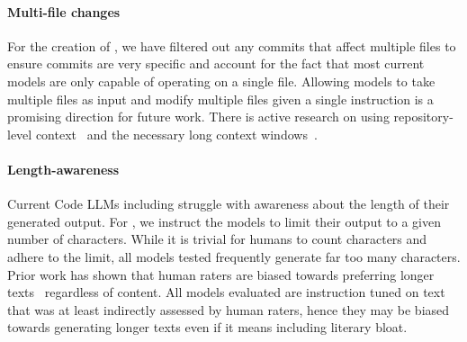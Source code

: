 \paragraph{Multi-file changes} For the creation of \data{}, we have filtered out any commits that affect multiple files to ensure commits are very specific and account for the fact that most current models are only capable of operating on a single file. Allowing models to take multiple files as input and modify multiple files given a single instruction is a promising direction for future work. There is active research on using repository-level context~\citep{ding2022cocomic,shrivastava2023repofusion,shrivastava2023repository,zhang2023repocoder,liu2023repobench} and the necessary long context windows~\citep{dai2019transformer,press2021train,Sun2021DoLL,dao2022flashattention,peng2023rwkv,liu2023lost,chen2023extending}.

\paragraph{Length-awareness} Current Code LLMs including \model{} struggle with awareness about the length of their generated output. For \evale{}, we instruct the models to limit their output to a given number of characters. While it is trivial for humans to count characters and adhere to the limit, all models tested frequently generate far too many characters. Prior work has shown that human raters are biased towards preferring longer texts~\citep{wu2023style} regardless of content. All models evaluated are instruction tuned on text that was at least indirectly assessed by human raters, hence they may be biased towards generating longer texts even if it means including literary bloat.

